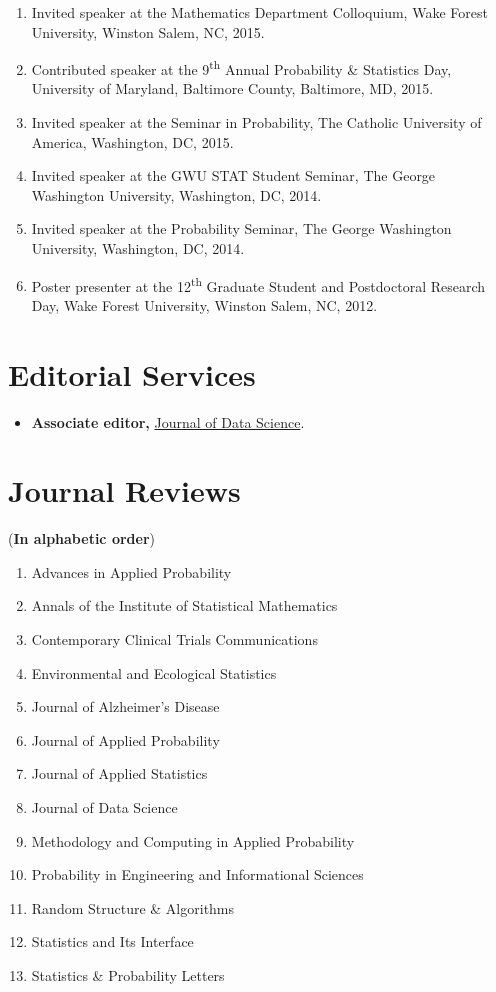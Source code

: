 \documentclass[margin]{res}
\begin{document}
\begin{resume}
\begin{enumerate}
	\item Invited speaker at the Mathematics Department Colloquium, Wake Forest University, Winston Salem, NC, 2015. 
	\item Contributed speaker at the 9\textsuperscript{th} Annual Probability \& Statistics Day, University of Maryland, Baltimore County, Baltimore, MD, 2015.
	\item Invited speaker at the Seminar in Probability, The Catholic University of America, Washington, DC, 2015.
	\item Invited speaker at the GWU STAT Student Seminar, The George Washington University, Washington, DC, 2014.
	\item Invited speaker at the Probability Seminar, The George Washington University, Washington, DC, 2014.
	\item Poster presenter at the 12\textsuperscript{th} Graduate Student and Postdoctoral Research Day, Wake Forest University, Winston Salem, NC, 2012.
\end{enumerate}

\section{Editorial Services}
\begin{itemize}
	\item \textbf{Associate editor,} 
	\href{https://jds-online.org/journal/JDS}{Journal of Data 
	Science}.
\end{itemize}

\section{Journal Reviews}
({\bf In alphabetic order})
\begin{enumerate}
	\item Advances in Applied Probability
	\item Annals of the Institute of Statistical Mathematics
	\item Contemporary Clinical Trials Communications
	\item Environmental and Ecological Statistics
	\item Journal of Alzheimer's Disease
	\item Journal of Applied Probability
	\item Journal of Applied Statistics 
	\item Journal of Data Science
	\item Methodology and Computing in Applied Probability
	\item Probability in Engineering and Informational Sciences
	\item Random Structure \& Algorithms
	\item Statistics and Its Interface
	\item Statistics \& Probability Letters
\end{enumerate}


\end{resume}
\end{document}
